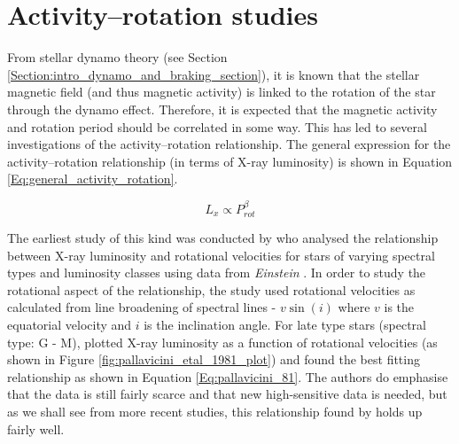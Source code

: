
\section{Activity--rotation studies}
\label{Chp2_activity-rotation_lit_review}

From stellar dynamo theory (see Section \ref{Section:intro_dynamo_and_braking_section}), it is known that the stellar magnetic field (and thus magnetic activity) is linked to the rotation of the star through the dynamo effect. Therefore, it is expected that the magnetic activity and rotation period should be correlated in some way. This has led to several investigations of the activity--rotation relationship. The general expression for the activity--rotation relationship (in terms of X-ray luminosity) is shown in Equation \ref{Eq:general_activity_rotation}.

\begin{equation}
    L_{x} \propto P_{rot}^{\beta}
    \label{Eq:general_activity_rotation}
\end{equation}

The earliest study of this kind was conducted by \citet{Pallavicini_etal_1981} who analysed the relationship between X-ray luminosity and rotational velocities for stars of varying spectral types and luminosity classes using data from \textit{Einstein} \citep{Giacconi_etal_1979}. In order to study the rotational aspect of the relationship, the study used rotational velocities as calculated from line broadening of spectral lines - $v\sin(i)$ where $v$ is the equatorial velocity and $i$ is the inclination angle. For late type stars (spectral type: G - M), \citet{Pallavicini_etal_1981} plotted X-ray luminosity as a function of rotational velocities (as shown in Figure \ref{fig:pallavicini_etal_1981_plot}) and found the best fitting relationship as shown in Equation \ref{Eq:pallavicini_81}. The authors do emphasise that the data is still fairly scarce and that new high-sensitive data is needed, but as we shall see from more recent studies, this relationship found by \citet{Pallavicini_etal_1981} holds up fairly well.

